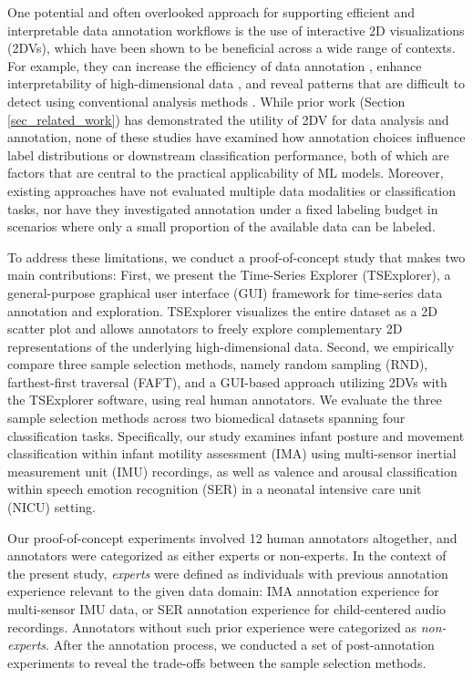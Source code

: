 \documentclass[a4paper,fleqn]{cas-dc}
\begin{document}
One potential and often overlooked approach for supporting efficient and interpretable data annotation workflows is the use of interactive 2D visualizations (2DVs), which have been shown to be beneficial across a wide range of contexts. For example, they can increase the efficiency of data annotation \cite{vision6d, umap_imaging_flow_cytometry, fallgren_interspeech}, enhance interpretability of high-dimensional data \cite{vision6d, t_visne_article, voxplorer, CZ_CELLxGENE, cytometry_2d_embeddings, dino_clinical_data_2d}, and reveal patterns that are difficult to detect using conventional analysis methods \cite{visne_article, cytometry_2d_embeddings}. While prior work (Section \ref{sec_related_work}) has demonstrated the utility of 2DV for data analysis and annotation, none of these studies have examined how annotation choices influence label distributions or downstream classification performance, both of which are factors that are central to the practical applicability of ML models. Moreover, existing approaches have not evaluated multiple data modalities or classification tasks, nor have they investigated annotation under a fixed labeling budget in scenarios where only a small proportion of the available data can be labeled.

To address these limitations, we conduct a proof-of-concept study that makes two main contributions: First, we present the Time-Series Explorer (TSExplorer), a general-purpose graphical user interface (GUI) framework for time-series data annotation and exploration. TSExplorer visualizes the entire dataset as a 2D scatter plot and allows annotators to freely explore complementary 2D representations of the underlying high-dimensional data. Second, we empirically compare three sample selection methods, namely random sampling (RND), farthest-first traversal (FAFT), and a GUI-based approach utilizing 2DVs with the TSExplorer software, using real human annotators. We evaluate the three sample selection methods across two biomedical datasets spanning four classification tasks. Specifically, our study examines infant posture and movement classification within infant motility assessment (IMA) using multi-sensor inertial measurement unit (IMU) recordings, as well as valence and arousal classification within speech emotion recognition (SER) in a neonatal intensive care unit (NICU) setting.

Our proof-of-concept experiments involved 12 human annotators altogether, and annotators were categorized as either experts or non-experts. In the context of the present study, \textit{experts} were defined as individuals with previous annotation experience relevant to the given data domain: IMA annotation experience for multi-sensor IMU data, or SER annotation experience for child-centered audio recordings. Annotators without such prior experience were categorized as \textit{non-experts}. After the annotation process, we conducted a set of post-annotation experiments to reveal the trade-offs between the sample selection methods.
\end{document}
